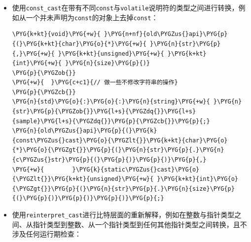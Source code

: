 \begin{itemize}

\item 使用\texttt{const\_\allowbreak{}cast}在带有不同\texttt{const}与\texttt{volatile}说明符的类型之间进行转换，例如从一个并未声明为\texttt{const}的对象上去掉\texttt{const}：



\begin{codeblockbg}
\begin{Verbatim}[commandchars=\\\{\},breaklines=true,breakanywhere=true,fontsize=\codefont,xleftmargin=17bp]
\PYG{k+kt}{void}\PYG{+w}{ }\PYG{n+nf}{old\PYGZus{}api}\PYG{p}{(}\PYG{k+kt}{char}\PYG{o}{*}\PYG{+w}{ }\PYG{n}{str}\PYG{p}{,}\PYG{+w}{ }\PYG{k+kt}{unsigned}\PYG{+w}{ }\PYG{k+kt}{int}\PYG{+w}{ }\PYG{n}{size}\PYG{p}{)}
\PYG{p}{\PYGZob{}}
\PYG{+w}{  }\PYG{c+c1}{// 做一些不修改字符串的操作}
\PYG{p}{\PYGZcb{}}
\PYG{n}{std}\PYG{o}{:}\PYG{o}{:}\PYG{n}{string}\PYG{+w}{ }\PYG{n}{str}\PYG{p}{\PYGZob{}}\PYG{l+s}{\PYGZdq{}}\PYG{l+s}{sample}\PYG{l+s}{\PYGZdq{}}\PYG{p}{\PYGZcb{}}\PYG{p}{;}
\PYG{n}{old\PYGZus{}api}\PYG{p}{(}\PYG{k}{const\PYGZus{}cast}\PYG{o}{\PYGZlt{}}\PYG{k+kt}{char}\PYG{o}{*}\PYG{o}{\PYGZgt{}}\PYG{p}{(}\PYG{n}{str}\PYG{p}{.}\PYG{n}{c\PYGZus{}str}\PYG{p}{(}\PYG{p}{)}\PYG{p}{)}\PYG{p}{,}
\PYG{+w}{        }\PYG{k}{static\PYGZus{}cast}\PYG{o}{\PYGZlt{}}\PYG{k+kt}{unsigned}\PYG{+w}{ }\PYG{k+kt}{int}\PYG{o}{\PYGZgt{}}\PYG{p}{(}\PYG{n}{str}\PYG{p}{.}\PYG{n}{size}\PYG{p}{(}\PYG{p}{)}\PYG{p}{)}\PYG{p}{)}\PYG{p}{;}
\end{Verbatim}
\end{codeblockbg}



\item 使用\texttt{reinterpret\_\allowbreak{}cast}进行比特层面的重新解释，例如在整数与指针类型之间、从指针类型到整数、从一个指针类型到任何其他指针类型之间转换，且不涉及任何运行期检查：




\end{itemize}
